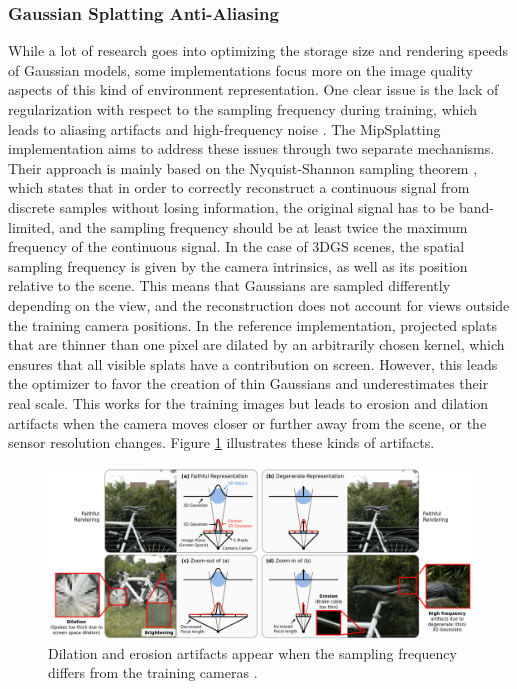 \subsubsection{Gaussian Splatting Anti-Aliasing}
While a lot of research goes into optimizing the storage size and rendering speeds of Gaussian models, some implementations focus more on the image quality aspects of this kind of environment representation. One clear issue is the lack of regularization with respect to the sampling frequency during training, which leads to aliasing artifacts and high-frequency noise \cite{Yu2024MipSplatting}. The MipSplatting implementation aims to address these issues through two separate mechanisms. Their approach is mainly based on the Nyquist-Shannon sampling theorem \cite{nyquist}, which states that in order to correctly reconstruct a continuous signal from discrete samples without losing information, the original signal has to be band-limited, and the sampling frequency should be at least twice the maximum frequency of the continuous signal. In the case of 3DGS scenes, the spatial sampling frequency is given by the camera intrinsics, as well as its position relative to the scene. This means that Gaussians are sampled differently depending on the view, and the reconstruction does not account for views outside the training camera positions. In the reference implementation, projected splats that are thinner than one pixel are dilated by an arbitrarily chosen kernel, which ensures that all visible splats have a contribution on screen. However, this leads the optimizer to favor the creation of thin Gaussians and underestimates their real scale. This works for the training images but leads to erosion and dilation artifacts when the camera moves closer or further away from the scene, or the sensor resolution changes. Figure \ref{fig:mipsplat_degen} illustrates these kinds of artifacts.

\begin{figure}[H]
    \centering
    \includegraphics[width=0.8\linewidth]{figures/mipsplat_degen.png}
    \caption{Dilation and erosion artifacts appear when the sampling frequency differs from the training cameras \cite{Yu2024MipSplatting}.}
    \label{fig:mipsplat_degen}
\end{figure}

